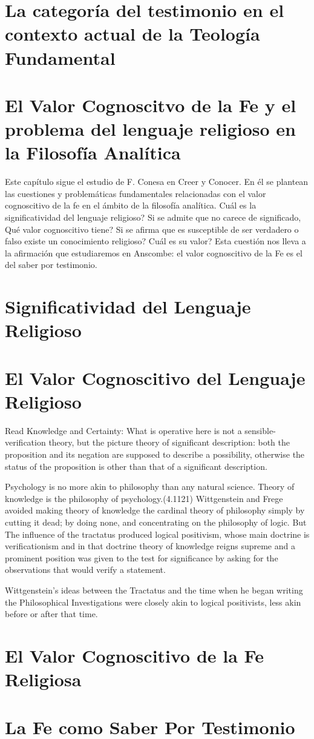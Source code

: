 \section{La categoría del testimonio en el contexto actual de la Teología
  Fundamental}



\section{El Valor Cognoscitvo de la Fe y el problema del lenguaje religioso en la
Filosofía Analítica}

Este capítulo sigue el estudio de F. Conesa en Creer y Conocer. En él se
plantean las cuestiones y problemáticas fundamentales relacionadas con el valor
cognoscitivo de la fe en el ámbito de la filosofía analítica.
\textquestiondown{}Cuál es la significatividad del lenguaje religioso? Si se
admite que no carece de significado, \textquestiondown{}Qué valor cognoscitivo
tiene? Si se afirma que es susceptible de ser verdadero o falso
\textquestiondown{}existe un conocimiento religioso? \textquestiondown{}Cuál es
su valor? Esta cuestión nos lleva a la afirmación que estudiaremos en Anscombe:
el valor cognoscitivo de la Fe es el del saber por testimonio.


\section{Significatividad del Lenguaje Religioso}

\section{El Valor Cognoscitivo del Lenguaje Religioso}

Read Knowledge and Certainty: What is operative here is not a
sensible-verification theory, but the picture theory of significant description:
both the proposition and its negation are supposed to describe a possibility,
otherwise the status of the proposition is other than that of a significant
description.

Psychology is no more akin to philosophy than any natural science. Theory of
knowledge is the philosophy of psychology.(4.1121) Wittgenstein and Frege
avoided making theory of knowledge the cardinal theory of philosophy simply by
cutting it dead; by doing none, and concentrating on the philosophy of logic.
But The influence of the tractatus produced logical positivism, whose main
doctrine is verificationism and in that doctrine theory of knowledge reigns
supreme and a prominent position was given to the test for significance by
asking for the observations that would verify a statement.

Wittgenstein's ideas between the Tractatus and the time when he began writing
the Philosophical Investigations were closely akin to logical positivists, less
akin before or after that time.

\section{El Valor Cognoscitivo de la Fe Religiosa}

\section{La Fe como Saber Por Testimonio}
